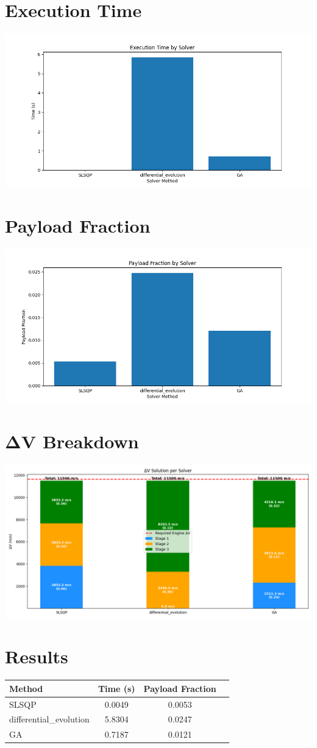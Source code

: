 \documentclass{article}
\begin{document}
\section{Execution Time}
\includegraphics[width=\textwidth]{execution_time.png}

\section{Payload Fraction}
\includegraphics[width=\textwidth]{payload_fraction.png}
                
\section{ΔV Breakdown}
\includegraphics[width=\textwidth]{dv_breakdown.png}

\section{Results}
\begin{tabular}{lccc}
\hline
Method & Time (s) & Payload Fraction \\
\hline
SLSQP & 0.0049 & 0.0053 \\
differential_evolution & 5.8304 & 0.0247 \\
GA & 0.7187 & 0.0121 \\
\hline
\end{tabular}
\end{document}
